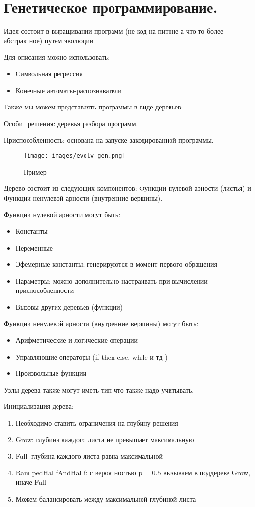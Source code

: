 \section{Генетическое программирование.}
Идея состоит в выращивании программ (не код на питоне а что то более абстрактное) путем эволюции

Для описания можно использовать:
\begin{itemize}
\item Символьная регрессия
\item Конечные автоматы-распознаватели
\end{itemize}
Также мы можем представлять программы в виде деревьев:

Особи=решения: деревья разбора программ.

Приспособленность: основана на запуске закодированной программы. 
 \begin{figure}[h]
\centering
\texttt{[image: images/evolv\_gen.png]}
\caption{Пример}
\label{fig:mpr}
\end{figure}

Дерево состоит из следующих компонентов: Функции нулевой арности (листья) и Функции ненулевой арности (внутренние вершины).

Функции нулевой арности могут быть:
\begin{itemize}
	\item Константы
	\item Переменные
	\item Эфемерные константы: генерируются в момент первого обращения
	\item Параметры: можно дополнительно настраивать при вычислении приспособленности
	\item Вызовы других деревьев (функции)
\end{itemize}

Функции ненулевой арности (внутренние вершины) могут быть:
\begin{itemize}
	\item Арифметические и логические операции
	\item Управляющие операторы (if-then-else, while и тд )
	\item Произвольные функции
\end{itemize}
Узлы дерева также могут иметь тип что также надо учитывать. 

Инициализация дерева:
\begin{enumerate} 
	\item Необходимо ставить ограничения на глубину решения 
	\item Grow: глубина каждого листа не превышает максимальную
	\item Full: глубина каждого листа равна максимальной
	\item Ram pedHal fAndHal f: с вероятностью p = 0.5 вызываем в поддереве Grow, иначе Full
	\item Можем балансировать между максимальной глубиной листа
\end{enumerate}

